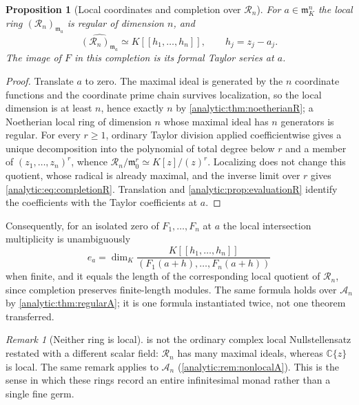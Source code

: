 \documentclass[11pt,letterpaper]{article}
\newtheorem{proposition}[theorem]{Proposition}
\theoremstyle{definition}
\theoremstyle{remark}
\newtheorem{remark}[theorem]{Remark}
\newcommand{\C}{\mathbb C}
\newcommand{\A}{\mathscr A}
\newcommand{\RR}{\mathscr R}
\newcommand{\m}{\mathfrak m}
\numberwithin{equation}{section}
\begin{document}
\begin{proposition}[Local coordinates and completion over $\RR_n$]
\label{analytic:prop:completionR}
For $a\in\m_K^n$ the local ring $(\RR_n)_{\m_a}$ is regular of dimension
$n$, and
\begin{equation}\label{analytic:eq:completionR}
 \widehat{(\RR_n)_{\m_a}}\simeq K[[h_1,\ldots,h_n]],\qquad h_j=z_j-a_j .
\end{equation}
The image of $F$ in this completion is its formal Taylor series at $a$.
\end{proposition}
\begin{proof}
Translate $a$ to zero. The maximal ideal is generated by the $n$ coordinate
functions and the coordinate prime chain survives localization, so the local
dimension is at least $n$, hence exactly $n$ by
\cref{analytic:thm:noetherianR}; a Noetherian local ring of dimension $n$
whose maximal ideal has $n$ generators is regular. For every $r\ge1$,
ordinary Taylor division applied coefficientwise gives a unique
decomposition into the polynomial of total degree below $r$ and a member of
$(z_1,\ldots,z_n)^r$, whence
$\RR_n/\m_0^r\simeq K[z]/(z)^r$. Localizing does not change this quotient,
whose radical is already maximal, and the inverse limit over $r$ gives
\eqref{analytic:eq:completionR}. Translation and
\cref{analytic:prop:evaluationR} identify the coefficients with the Taylor
coefficients at $a$.
\end{proof}

Consequently, for an isolated zero of $F_1,\ldots,F_n$ at $a$ the local
intersection multiplicity is unambiguously
\begin{equation}\label{analytic:eq:localmultiplicity}
 e_a=\dim_K\frac{K[[h_1,\ldots,h_n]]}{(F_1(a+h),\ldots,F_n(a+h))}
\end{equation}
when finite, and it equals the length of the corresponding local quotient of
$\RR_n$, since completion preserves finite-length modules. The same formula
holds over $\A_n$ by \cref{analytic:thm:regularA}; it is one formula
instantiated twice, not one theorem transferred.

\begin{remark}[Neither ring is local]\label{analytic:rem:nonlocalR}
 is not the ordinary complex local
Nullstellensatz restated with a different scalar field: $\RR_n$ has many
maximal ideals, whereas $\C\{z\}$ is local. The same remark applies to
$\A_n$ (\cref{analytic:rem:nonlocalA}). This is the sense in which these
rings record an entire infinitesimal monad rather than a single fine germ.
\end{remark}
\end{document}
